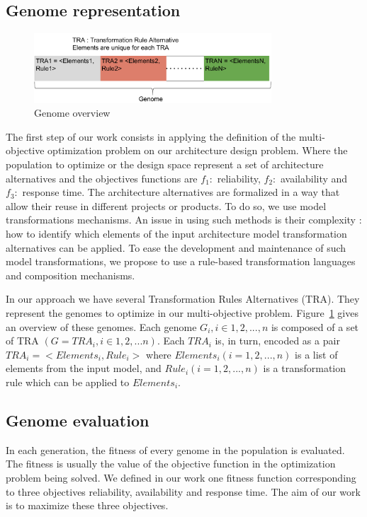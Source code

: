 \documentclass[conference]{IEEEtran}
\begin{document}
\subsection{Genome representation}

\begin{figure}[!ht]
\centering
\includegraphics[width=3.49in]{genome.pdf}
\caption{Genome overview}
\label{genome}
\end{figure}

The first step of our work consists in applying the definition of the multi-objective optimization problem on our architecture design problem. Where the population to optimize or the design space represent a set of architecture alternatives and the objectives functions are $f_{1}:$ reliability, $f_{2}:$ availability and $f_{3}:$ response time. The architecture alternatives are formalized in a way that allow their reuse in different projects or products. To do so, we use model transformations mechanisms. An issue in using such methods is their complexity : how to identify which elements of the input architecture model transformation alternatives can be applied. To ease the development and maintenance of such model transformations, we propose to use a rule-based transformation languages and composition mechanisms. 

In our approach we have several Transformation Rules Alternatives (TRA). They represent the genomes to optimize in our multi-objective problem. Figure~\ref{genome} gives an overview of these genomes. Each genome $G_{i}, i \in {1,2,...,n}$ is composed of a set of TRA $(G = {TRA_{i}, i \in {1,2,...n}})$. Each $TRA_{i}$ is, in turn, encoded as a pair $TRA_{i} = <Elements_{i},Rule_{i}>$ where $Elements_{i} (i ={1,2,...,n})$ is a list of elements from the input model, and $Rule_{i} (i ={1,2,...,n})$ is a transformation rule which can be applied to $Elements_{i}$.

\subsection{Genome evaluation}
In each generation, the fitness of every genome in the population is evaluated. The fitness is usually the value of the objective function in the optimization problem being solved. We defined in our work one fitness function corresponding to three objectives reliability, availability and response time.
The aim of our work is to maximize these three objectives. 
\end{document}
